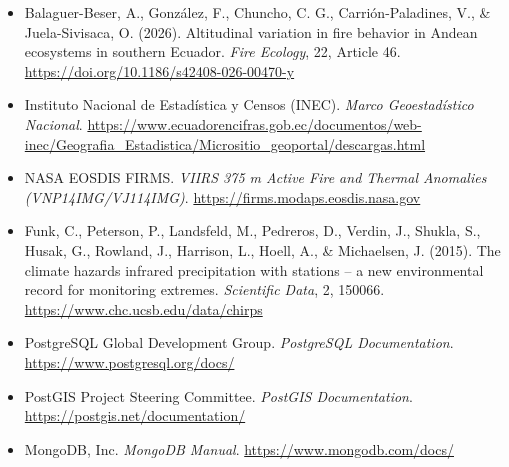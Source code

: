 \documentclass[11pt,a4paper]{article}
\begin{document}
\footnotesize
\begin{itemize}
    \item Balaguer-Beser, A., Gonz\'alez, F., Chuncho, C. G., Carri\'on-Paladines, V., \& Juela-Sivisaca, O. (2026). Altitudinal variation in fire behavior in Andean ecosystems in southern Ecuador. \textit{Fire Ecology}, 22, Article 46. \url{https://doi.org/10.1186/s42408-026-00470-y}
    \item Instituto Nacional de Estad\'istica y Censos (INEC). \textit{Marco Geoestad\'istico Nacional}. \url{https://www.ecuadorencifras.gob.ec/documentos/web-inec/Geografia_Estadistica/Micrositio_geoportal/descargas.html}
    \item NASA EOSDIS FIRMS. \textit{VIIRS 375 m Active Fire and Thermal Anomalies (VNP14IMG/VJ114IMG)}. \url{https://firms.modaps.eosdis.nasa.gov}
    \item Funk, C., Peterson, P., Landsfeld, M., Pedreros, D., Verdin, J., Shukla, S., Husak, G., Rowland, J., Harrison, L., Hoell, A., \& Michaelsen, J. (2015). The climate hazards infrared precipitation with stations -- a new environmental record for monitoring extremes. \textit{Scientific Data}, 2, 150066. \url{https://www.chc.ucsb.edu/data/chirps}
    \item PostgreSQL Global Development Group. \textit{PostgreSQL Documentation}. \url{https://www.postgresql.org/docs/}
    \item PostGIS Project Steering Committee. \textit{PostGIS Documentation}. \url{https://postgis.net/documentation/}
    \item MongoDB, Inc. \textit{MongoDB Manual}. \url{https://www.mongodb.com/docs/}
\end{itemize}
\normalsize
\end{document}
